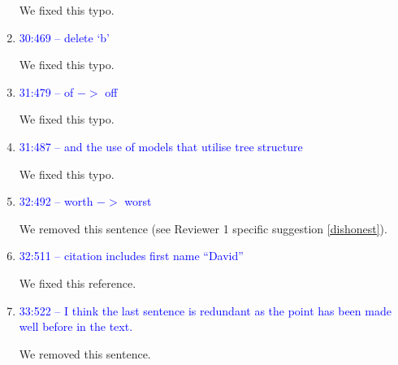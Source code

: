 \documentclass[12pt,letterpaper]{article}
\begin{document}
\begin{enumerate}
We fixed this typo.

\item{\textcolor{blue}{30:469 – delete ‘b'}}

We fixed this typo.

\item{\textcolor{blue}{31:479 – of $->$ off}}

We fixed this typo.

\item{\textcolor{blue}{31:487 – and the use of models that utilise tree structure}}

We fixed this typo.

\item{\textcolor{blue}{32:492 – worth $->$ worst}}

We removed this sentence (see Reviewer 1 specific suggestion \ref{dishonest}).

\item{\textcolor{blue}{32:511 – citation includes first name ``David''}}

We fixed this reference.

\item{\textcolor{blue}{33:522 – I think the last sentence is redundant as the point has been made well before in the text.}}

We removed this sentence.

\end{enumerate}




\end{document}
